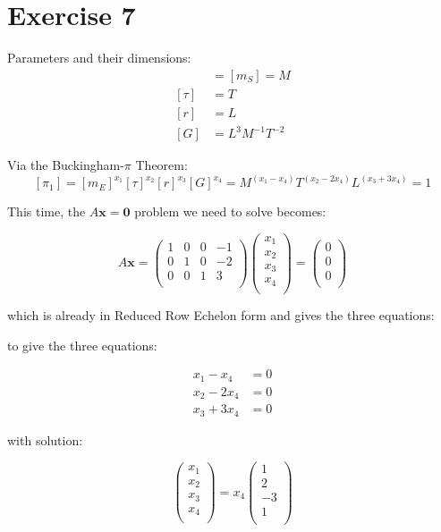 \documentclass{article}
\begin{document}
\section{Exercise 7}

Parameters and their dimensions: \begin{align}
[m_E] &= [m_S] = M \\
[\tau] &= T \\
[r] &= L \\
[G] &= L^3 M^{-1} T^{-2}
\end{align}

Via the Buckingham-$\pi$ Theorem:
\[ [\pi_1] = [m_E]^{x_1}[\tau]^{x_2}[r]^{x_3}[G]^{x_4} = M^{(x_1-x_4)}T^{(x_2-2x_4)}L^{(x_3+3x_4)} = 1\]

This time, the $A\bm{x}=\bm{0}$ problem we need to solve becomes:

\begin{equation}
A\bm{x} = \begin{pmatrix}
1&0&0&-1 \\
0&1&0&-2 \\
0&0&1&3 \\
\end{pmatrix}
\begin{pmatrix}
x_1\\
x_2\\
x_3\\
x_4\\
\end{pmatrix}
=
\begin{pmatrix}
0\\
0\\
0\\
\end{pmatrix}
\end{equation}

which is already in Reduced Row Echelon form and gives the three equations:

to give the three equations:

\begin{align}
x_1 - x_4 &= 0 \\
x_2 - 2 x_4 &= 0 \\
x_3 + 3 x_4 &= 0 
\end{align}

with solution:

\begin{equation}
\begin{pmatrix}
x_1\\
x_2\\
x_3\\
x_4\\
\end{pmatrix}
= x_4
\begin{pmatrix}
1\\
2\\
-3\\
1\\
\end{pmatrix}
\end{equation}
\end{document}
